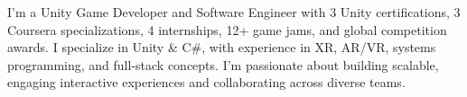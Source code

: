 \documentclass[9pt]{developercv}
\begin{document}
	\begin{minipage}[t]{0.4\textwidth}
		\vspace{-\baselineskip}
		I’m a Unity Game Developer and Software Engineer with 3 Unity certifications, 3 Coursera specializations, 4 internships, 12+ game jams, and global competition awards. I specialize in Unity \& C\#, with experience in XR, AR/VR, systems programming, and full-stack concepts. I’m passionate about building scalable, engaging interactive experiences and collaborating across diverse teams.\\
	\end{minipage}
	\hfill
	\begin{minipage}[t]{0.5\textwidth}
		\vspace{-\baselineskip}
		
		\begin{barchart}{5.5}
		\end{barchart}
	\end{minipage}
	
	
	
\end{document}
